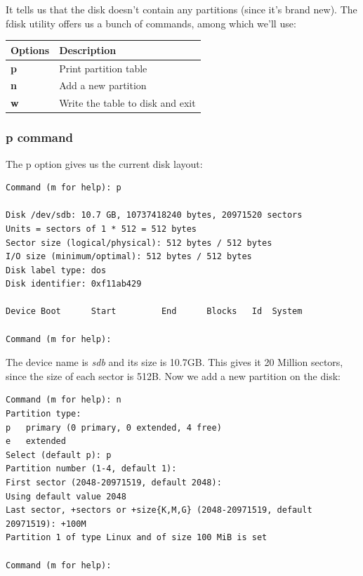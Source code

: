 \noindent
It tells us that the disk doesn't contain any partitions (since it's brand new). The fdisk utility offers us a bunch of commands, among which we'll use:

\noindent
\begin{tabular}{lM{0.84}}
	\toprule
	\textbf{Options} &\textbf{Description} \\
	\midrule
	\textbf{p}	&Print partition table \\
	\textbf{n}	&Add a new partition \\
	\textbf{w}	&Write the table to disk and exit \\
	\bottomrule
\end{tabular}

\subsubsection{p command}
\vspace{-10pt}
The p option gives us the current disk layout:

\vspace{-15pt}
\begin{verbatim}
Command (m for help): p

Disk /dev/sdb: 10.7 GB, 10737418240 bytes, 20971520 sectors
Units = sectors of 1 * 512 = 512 bytes
Sector size (logical/physical): 512 bytes / 512 bytes
I/O size (minimum/optimal): 512 bytes / 512 bytes
Disk label type: dos
Disk identifier: 0xf11ab429

Device Boot      Start         End      Blocks   Id  System

Command (m for help): 
\end{verbatim}
\vspace{-10pt}

\noindent
The device name is \textit{sdb} and its size is 10.7GB. This gives it 20 Million sectors, since the size of each sector is 512B. Now we add a new partition on the disk:

\vspace{-15pt}
\begin{verbatim}
Command (m for help): n
Partition type:
p   primary (0 primary, 0 extended, 4 free)
e   extended
Select (default p): p
Partition number (1-4, default 1): 
First sector (2048-20971519, default 2048): 
Using default value 2048
Last sector, +sectors or +size{K,M,G} (2048-20971519, default 20971519): +100M
Partition 1 of type Linux and of size 100 MiB is set

Command (m for help): 
\end{verbatim}
\vspace{-10pt}

